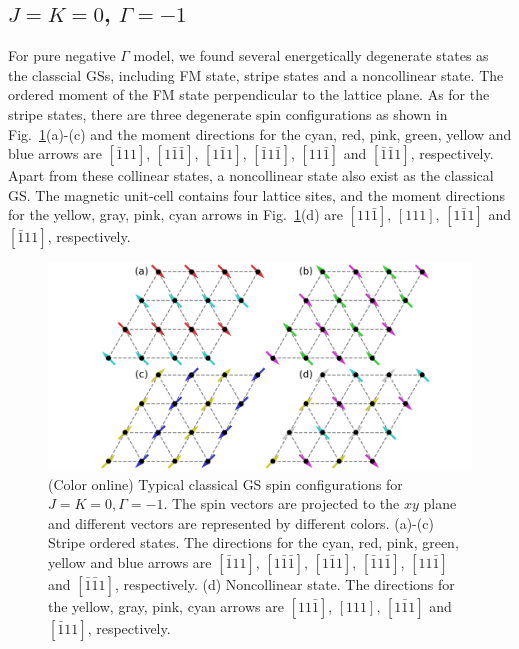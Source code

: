\documentclass[aps,prb,reprint,amsfonts,amsmath,amssymb,showpacs,groupedaddress,superscriptaddress]{revtex4-1}
\begin{document}
\subsection{$J=K=0$, $\Gamma=-1$}

For pure negative $\Gamma$ model, we found several energetically degenerate states as the classcial GSs, including FM state, stripe states and a noncollinear state. The ordered moment of the FM state perpendicular to the lattice plane. As for the stripe states, there are three degenerate spin configurations as shown in Fig.~\ref{fig:GSForNegativeGamma}(a)-(c) and the moment directions for the cyan, red, pink, green, yellow and blue arrows are $[\bar{1}11]$, $[1\bar{1}\bar{1}]$, $[1\bar{1}1]$, $[\bar{1}1\bar{1}]$, $[11\bar{1}]$ and $[\bar{1}\bar{1}1]$, respectively. Apart from these collinear states, a noncollinear state also exist as the classical GS. The magnetic unit-cell contains four lattice sites, and the moment directions for the yellow, gray, pink, cyan arrows in Fig.~\ref{fig:GSForNegativeGamma}(d) are $[11\bar{1}]$, $[111]$, $[1\bar{1}1]$ and $[\bar{1}11]$, respectively.
\begin{figure}
    \includegraphics[width=\columnwidth]{SpinConfigForNegativeGamma.pdf}
    \caption{\label{fig:GSForNegativeGamma}(Color online) Typical classical GS spin configurations for $J=K=0, \Gamma=-1$. The spin vectors are projected to the $xy$ plane and different vectors are represented by different colors. (a)-(c) Stripe ordered states. The directions for the cyan, red, pink, green, yellow and blue arrows are $[\bar{1}11]$, $[1\bar{1}\bar{1}]$, $[1\bar{1}1]$, $[\bar{1}1\bar{1}]$, $[11\bar{1}]$ and $[\bar{1}\bar{1}1]$, respectively. (d) Noncollinear state. The directions for the yellow, gray, pink, cyan arrows are $[11\bar{1}]$, $[111]$, $[1\bar{1}1]$ and $[\bar{1}11]$, respectively.}
\end{figure}
\end{document}
